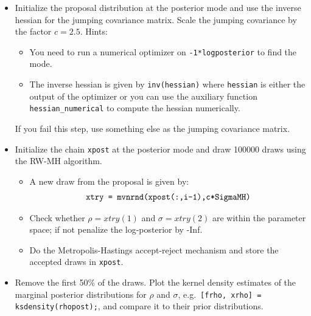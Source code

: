 \documentclass{article}
\begin{document}
\begin{enumerate}
\begin{itemize}
\item Initialize the proposal distribution at the posterior mode and use the inverse hessian for the jumping covariance matrix.
Scale the jumping covariance by the factor \(c=2.5\).
Hints:
  \begin{itemize}
  \item You need to run a numerical optimizer on \texttt{-1*logposterior} to find the mode.
  \item The inverse hessian is given by \texttt{inv(hessian)} where \texttt{hessian} is either the output of the optimizer
  or you can use the auxiliary function \texttt{hessian\_numerical} to compute the hessian numerically.
  \end{itemize}
  If you fail this step, use something else as the jumping covariance matrix.

\item Initialize the chain \texttt{xpost} at the posterior mode and draw 100000 draws using the RW-MH algorithm.
  \begin{itemize}
  \item A new draw from the proposal is given by:
\begin{align*}
\text{\texttt{xtry = mvnrnd{(xpost{(:,i-1)},c*SigmaMH)}}}
\end{align*}
  \item Check whether \(\rho=xtry(1)\) and \(\sigma=xtry(2)\) are within the parameter space; if not penalize the log-posterior by -Inf.
  \item Do the Metropolis-Hastings accept-reject mechanism and store the accepted draws in \texttt{xpost}.
  \end{itemize}

\item Remove the first 50\% of the draws.
Plot the kernel density estimates of the marginal posterior distributions for \(\rho \) and \(\sigma \), e.g.\ \texttt{[frho, xrho] = ksdensity(rhopost);},
  and compare it to their prior distributions.

\end{itemize}

\end{enumerate}
\end{document}
